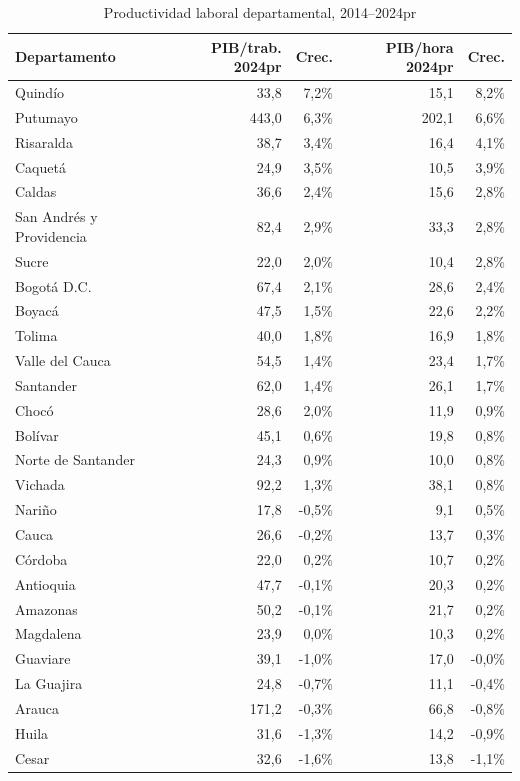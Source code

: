 \begin{table}[H]
\centering
\caption{Productividad laboral departamental, 2014--2024pr}
\label{tab:dept_productividad_resumen_33}
\scriptsize
\begin{tabular}{lrrrr}
\toprule
Departamento & PIB/trab. 2024pr & Crec. & PIB/hora 2024pr & Crec. \\
\midrule
Quindío & 33,8 & 7,2\% & 15,1 & 8,2\% \\
Putumayo & 443,0 & 6,3\% & 202,1 & 6,6\% \\
Risaralda & 38,7 & 3,4\% & 16,4 & 4,1\% \\
Caquetá & 24,9 & 3,5\% & 10,5 & 3,9\% \\
Caldas & 36,6 & 2,4\% & 15,6 & 2,8\% \\
San Andrés y Providencia & 82,4 & 2,9\% & 33,3 & 2,8\% \\
Sucre & 22,0 & 2,0\% & 10,4 & 2,8\% \\
Bogotá D.C. & 67,4 & 2,1\% & 28,6 & 2,4\% \\
Boyacá & 47,5 & 1,5\% & 22,6 & 2,2\% \\
Tolima & 40,0 & 1,8\% & 16,9 & 1,8\% \\
Valle del Cauca & 54,5 & 1,4\% & 23,4 & 1,7\% \\
Santander & 62,0 & 1,4\% & 26,1 & 1,7\% \\
Chocó & 28,6 & 2,0\% & 11,9 & 0,9\% \\
Bolívar & 45,1 & 0,6\% & 19,8 & 0,8\% \\
Norte de Santander & 24,3 & 0,9\% & 10,0 & 0,8\% \\
Vichada & 92,2 & 1,3\% & 38,1 & 0,8\% \\
Nariño & 17,8 & -0,5\% & 9,1 & 0,5\% \\
Cauca & 26,6 & -0,2\% & 13,7 & 0,3\% \\
Córdoba & 22,0 & 0,2\% & 10,7 & 0,2\% \\
Antioquia & 47,7 & -0,1\% & 20,3 & 0,2\% \\
Amazonas & 50,2 & -0,1\% & 21,7 & 0,2\% \\
Magdalena & 23,9 & 0,0\% & 10,3 & 0,2\% \\
Guaviare & 39,1 & -1,0\% & 17,0 & -0,0\% \\
La Guajira & 24,8 & -0,7\% & 11,1 & -0,4\% \\
Arauca & 171,2 & -0,3\% & 66,8 & -0,8\% \\
Huila & 31,6 & -1,3\% & 14,2 & -0,9\% \\
Cesar & 32,6 & -1,6\% & 13,8 & -1,1\% \\

\end{tabular}
\end{table}
